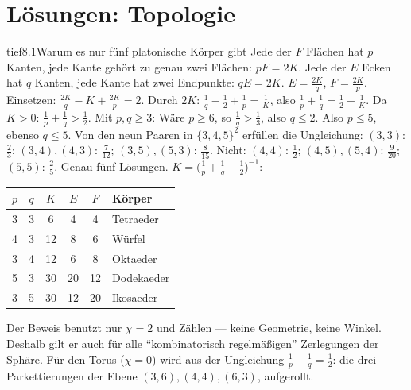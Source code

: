 \chapter{Lösungen: Topologie}

\begin{loesungkarte}{tief}{8.1}{Warum es nur fünf platonische Körper gibt}
Jede der $F$ Flächen hat $p$ Kanten, jede Kante gehört zu genau zwei Flächen: $pF = 2K$. Jede der $E$ Ecken hat $q$ Kanten, jede Kante hat zwei Endpunkte: $qE = 2K$.
$E = \frac{2K}q$, $F = \frac{2K}p$. Einsetzen: $\frac{2K}q - K + \frac{2K}p = 2$. Durch $2K$: $\frac1q - \frac12 + \frac1p = \frac1K$, also $\frac1p + \frac1q = \frac12 + \frac1K$.
Da $K > 0$: $\frac1p + \frac1q > \frac12$. Mit $p, q\ge3$: Wäre $p\ge6$, so $\frac1q > \frac13$, also $q\le2$. Also $p\le5$, ebenso $q\le5$. Von den neun Paaren in $\{3, 4, 5\}^{2}$ erfüllen die Ungleichung: $(3, 3)$: $\frac23$; $(3, 4), (4, 3)$: $\frac7{12}$; $(3, 5), (5, 3)$: $\frac8{15}$. Nicht: $(4, 4)$: $\frac12$; $(4, 5), (5, 4)$: $\frac9{20}$; $(5, 5)$: $\frac25$. Genau fünf Lösungen.
$K = \bigl(\frac1p + \frac1q - \frac12\bigr)^{-1}$:
\begin{center}\small
\begin{tabular}{cc|ccc|l}
$p$ & $q$ & $K$ & $E$ & $F$ & Körper\\ \hline
3 & 3 & 6 & 4 & 4 & Tetraeder\\
4 & 3 & 12 & 8 & 6 & Würfel\\
3 & 4 & 12 & 6 & 8 & Oktaeder\\
5 & 3 & 30 & 20 & 12 & Dodekaeder\\
3 & 5 & 30 & 12 & 20 & Ikosaeder
\end{tabular}
\end{center}
\begin{mitnehmen}\kastentext
Der Beweis benutzt nur $\chi = 2$ und Zählen --- keine Geometrie, keine Winkel. Deshalb gilt er auch für alle \enquote{kombinatorisch regelmäßigen} Zerlegungen der Sphäre. Für den Torus ($\chi = 0$) wird aus der Ungleichung $\frac1p + \frac1q = \frac12$: die drei Parkettierungen der Ebene $(3, 6), (4, 4), (6, 3)$, aufgerollt.
\end{mitnehmen}
\end{loesungkarte}

